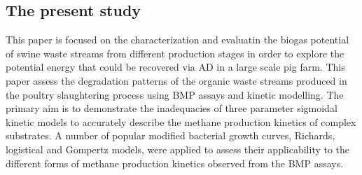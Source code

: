 \subsection{The present study}
This paper is focused on the characterization and evaluatin the biogas potential of swine waste streams from different production stages in order to explore the potential energy that could be recovered via AD in a large scale pig farm. This paper assess the degradation patterns of the organic waste streams produced in the poultry slaughtering process using BMP assays and kinetic modelling. The primary aim is to demonstrate the inadequacies of three parameter sigmoidal kinetic models to accurately describe the methane production kinetics of complex substrates. A number of popular modified bacterial growth curves, Richards, logistical and Gompertz models, were applied to assess their applicability to the different forms of methane production kinetics observed from the BMP assays.